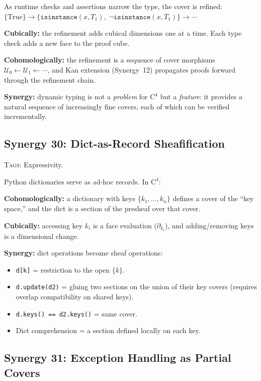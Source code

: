 \documentclass[11pt,a4paper]{article}
\theoremstyle{definition}
\theoremstyle{plain}
\newcommand{\covers}{\mathcal{U}}
\begin{document}
As runtime checks and assertions narrow the type, the cover is
refined: $\{\mathrm{True}\} \to \{\texttt{isinstance}(x, T_1),\;
\neg\texttt{isinstance}(x, T_1)\} \to \cdots$

\textbf{Cubically:} the refinement adds cubical dimensions one at a
time.  Each type check adds a new face to the proof cube.

\textbf{Cohomologically:} the refinement is a sequence of cover
morphisms $\covers_0 \leftarrow \covers_1 \leftarrow \cdots$,
and Kan extension (Synergy~12) propagates proofs forward through
the refinement chain.

\textbf{Synergy:} dynamic typing is not a \emph{problem} for
$\mathrm{C}^4$ but a \emph{feature}: it provides a natural sequence
of increasingly fine covers, each of which can be verified
incrementally.


\subsection{Synergy 30: Dict-as-Record Sheafification}
\label{sec:syn-dict}

\textsc{Tags:} Expressivity.

\medskip\noindent
Python dictionaries serve as ad-hoc records.  In $\mathrm{C}^4$:

\textbf{Cohomologically:} a dictionary with keys
$\{k_1, \ldots, k_n\}$ defines a cover of the ``key space,''
and the dict is a section of the presheaf over that cover.

\textbf{Cubically:} accessing key $k_i$ is a face evaluation
($\partial_{k_i}$), and adding/removing keys is a dimensional
change.

\textbf{Synergy:} dict operations become sheaf operations:
\begin{itemize}
\item \texttt{d[k]} = restriction to the open $\{k\}$.
\item \texttt{d.update(d2)} = gluing two sections on the union
  of their key covers (requires overlap compatibility on shared keys).
\item \texttt{d.keys() == d2.keys()} = same cover.
\item Dict comprehension = a section defined locally on each key.
\end{itemize}


\subsection{Synergy 31: Exception Handling as Partial Covers}
\label{sec:syn-exceptions}
\end{document}
